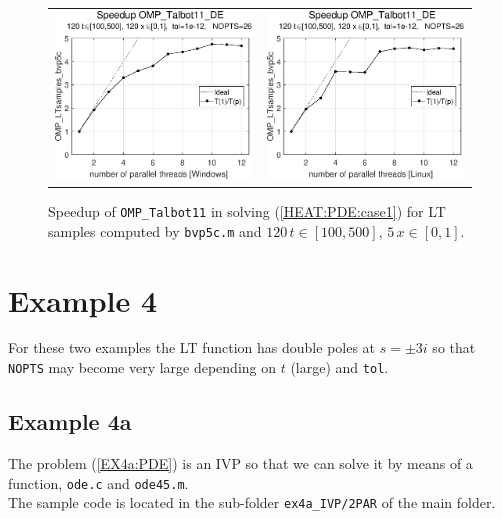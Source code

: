 \documentclass[a4paper,10pt]{report}%
\begin{document}
\begin{figure}[htb]
\centering
\begin{tabular}{cc} %
\includegraphics[height=0.2\textwidth]{./FIGS/EX3b/EX3b_bvp5c_speedup_11_Windows.eps} &
\includegraphics[height=0.2\textwidth]{./FIGS/EX3b/EX3b_bvp5c_speedup_11_Linux.eps}
\end{tabular}
\caption{\small Speedup of {\tt OMP\_Talbot11} in solving (\ref{HEAT:PDE:case1}) for LT samples computed
by {\tt bvp5c.m} and $120\,t\in[100,500]$, $5\,x\in[0,1]$.}
\label{PAR_EX3b_speedup_bvp5c}
\end{figure}


\newpage
\section{Example 4}
For these two examples the LT function has double poles at $s=\pm 3i$ so that {\tt NOPTS} may become
very large depending on $t$ (large) and {\tt tol}.


\subsection{Example 4a}
The problem (\ref{EX4a:PDE}) is an IVP so that we can solve it by means of a function, {\tt ode.c} and
{\tt ode45.m}.
\\
The sample code is located in the sub-folder {\tt ex4a\_IVP/2PAR} of the main folder.
\end{document}
